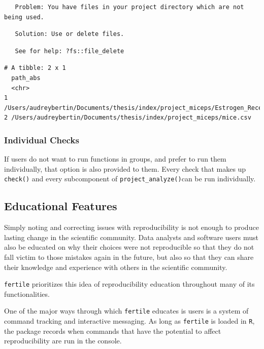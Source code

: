 \documentclass[12pt,twoside]{reedthesis}
\begin{document}
\begin{verbatim}
   Problem: You have files in your project directory which are not being used.
\end{verbatim}
\begin{verbatim}
   Solution: Use or delete files.
\end{verbatim}
\begin{verbatim}
   See for help: ?fs::file_delete
\end{verbatim}
\begin{verbatim}
# A tibble: 2 x 1
  path_abs                                                                      
  <chr>                                                                         
1 /Users/audreybertin/Documents/thesis/index/project_miceps/Estrogen_Receptors.~
2 /Users/audreybertin/Documents/thesis/index/project_miceps/mice.csv            
\end{verbatim}
\hypertarget{individual-checks}{%
\subsubsection{Individual Checks}\label{individual-checks}}

If users do not want to run functions in groups, and prefer to run them individually, that option is also provided to them. Every check that makes up \texttt{check()} and every subcomponent of \texttt{project\_analyze()}can be run individually.

\hypertarget{educational-features}{%
\subsection{Educational Features}\label{educational-features}}

Simply noting and correcting issues with reproducibility is not enough to produce lasting change in the scientific community. Data analysts and software users must also be educated on why their choices were not reproducible so that they do not fall victim to those mistakes again in the future, but also so that they can share their knowledge and experience with others in the scientific community.

\texttt{fertile} prioritizes this idea of reproducibility education throughout many of its functionalities.

One of the major ways through which \texttt{fertile} educates is users is a system of command tracking and interactive messaging. As long as \texttt{fertile} is loaded in \texttt{R}, the package records when commands that have the potential to affect reproducibility are run in the console.
\end{document}
